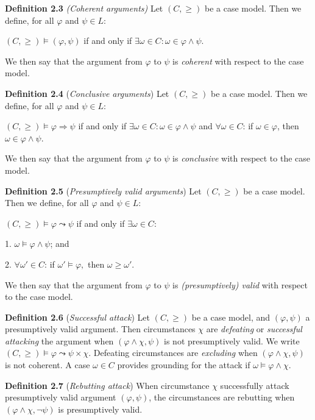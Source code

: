 \documentclass{IOS-Book-Article}
\begin{document}
\textbf{Definition 2.3} \textit{(Coherent arguments)} Let $(C,  \geq)$ be a case model. Then we define, for all $\varphi$ and $\psi \in L$:

$(C,  \geq) \vDash (\varphi,  \psi)$ if and only if $\exists \omega \in C: \omega \in \varphi \wedge \psi$.

We then say that the argument from $\varphi$ to $\psi$ is \textit{coherent} with respect to the case model.

\textbf{Definition 2.4} (\textit{Conclusive arguments}) Let $(C,  \geq)$ be a case model. Then we define, for all $\varphi$ and $\psi \in L$:

$(C,  \geq) \vDash \varphi \Rightarrow \psi$ if and only if $\exists \omega \in C: \omega \in \varphi \wedge \psi$ and $\forall \omega \in C$: if $\omega \in \varphi$, then $\omega \in \varphi \wedge \psi$.

We then say that the argument from $\varphi$ to $\psi$ is \textit{conclusive} with respect to the case model.

\textbf{Definition 2.5} (\textit{Presumptively valid arguments}) Let $(C,  \geq)$ be a case model. Then we define, for all $\varphi$ and $\psi \in L$:

$(C,  \geq) \vDash \varphi \leadsto \psi$ if and only if $\exists \omega \in C$:

1. $\omega \vDash \varphi \wedge \psi$; and

2. $\forall \omega' \in C$: if $\omega' \vDash \varphi, $ then $\omega \geq \omega'$.

We then say that the argument from $\varphi$ to $\psi$ is \textit{(presumptively) valid} with respect to the case model.

\textbf{Definition 2.6} (\textit{Successful attack}) Let $(C,  \geq)$ be a case model, and $(\varphi, \psi)$ a presumptively valid argument. Then circumstances $\chi$ are \textit{defeating} or \textit{successful attacking} the argument when $(\varphi \wedge \chi, \psi)$ is not presumptively valid. We write $(C,  \geq) \vDash \varphi \leadsto \psi \times \chi$. Defeating circumstances are \textit{excluding} when $(\varphi \wedge \chi, \psi)$ is not coherent. A case $\omega \in C$ provides grounding for the attack if $\omega \vDash \varphi \wedge \chi$.

\textbf{Definition 2.7} (\textit{Rebutting attack}) When circumstance $\chi$ successfully attack presumptively valid argument $(\varphi, \psi)$, the circumstances are rebutting when $(\varphi \wedge \chi, \neg \psi)$ is presumptively valid.
\end{document}
